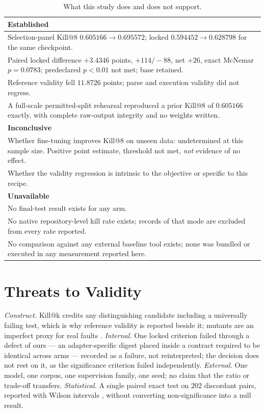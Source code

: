 \documentclass[10pt,conference]{IEEEtran}
\makeatletter
\newcommand{\killk}[1]{Kill@#1}
\makeatother
\begin{document}
\begin{table}[t]
\caption{What this study does and does not support.}
\label{tab:claims}
\centering
\footnotesize
\begin{tabular}{@{}p{}@{}}
\toprule
\textbf{Established} \\
\midrule
Selection-panel \killk{8} $0.605166 \to 0.695572$; locked
$0.594452 \to 0.628798$ for the same checkpoint. \\
Paired locked difference $+3.4346$ points, $+114/-88$, net $+26$, exact
McNemar $p = 0.0783$; predeclared $p < 0.01$ not met; base retained. \\
Reference validity fell $11.8726$ points; parse and execution validity did not
regress. \\
A full-scale permitted-split rehearsal reproduced a prior \killk{8} of
$0.605166$ exactly, with complete raw-output integrity and no weights written. \\
\midrule
\textbf{Inconclusive} \\
\midrule
Whether fine-tuning improves \killk{8} on unseen data: undetermined at this
sample size. Positive point estimate, threshold not met, \emph{not} evidence of
no effect. \\
Whether the validity regression is intrinsic to the objective or specific to
this recipe. \\
\midrule
\textbf{Unavailable} \\
\midrule
No final-test result exists for any arm. \\
No native repository-level kill rate exists; records of that mode are excluded
from every rate reported. \\
No comparison against any external baseline tool exists; none was bundled or
executed in any measurement reported here. \\
\bottomrule
\end{tabular}
\end{table}

\section{Threats to Validity}

\emph{Construct.} \killk{k} credits any distinguishing candidate including a
universally failing test, which is why reference validity is reported beside it;
mutants are an imperfect proxy for real faults
\cite{just2014mutants,papadakis2018mutationscores}.
\emph{Internal.} One locked criterion failed through a defect of ours --- an
adapter-specific digest placed inside a contract required to be identical across
arms --- recorded as a failure, not reinterpreted; the decision does not rest on
it, as the significance criterion failed independently.
\emph{External.} One model, one corpus, one supervision family, one seed; no
claim that the ratio or trade-off transfers.
\emph{Statistical.} A single paired exact test on 202 discordant pairs, reported
with Wilson intervals \cite{wilson1927probable,arcuri2014hitchhiker}, without
converting non-significance into a null result.
\end{document}
